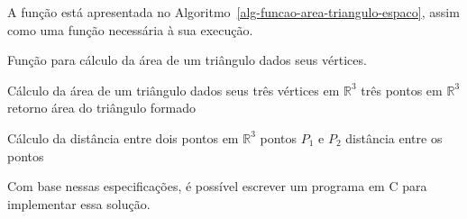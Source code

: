\documentclass[
  11pt,
  a4paper,
]{scrbook}
\begin{document}
A função  está apresentada no
Algoritmo~\ref{alg-funcao-area-triangulo-espaco}, assim como uma função
 necessária à sua execução.

\begin{algorithm}[H]
\caption{\label{alg-funcao-area-triangulo-espaco}Função para cálculo da
área de um triângulo dados seus vértices.}
\begingroup%

\begin{algorithmic}
    \Description Cálculo da área de um triângulo dados seus três vértices em $\mathbb{R}^3$
    \Require três pontos em $\mathbb{R}^3$
    \Ensure retorno área do triângulo formado
    \Statex
    \EndFunction

    \Statex{}
    \Statex{}
    \Description Cálculo da distância entre dois pontos em $\mathbb{R}^3$
    \Require pontos $P_1$ e $P_2$
    \Ensure distância entre os pontos
    \Statex
    \EndFunction
\end{algorithmic}

\endgroup
\end{algorithm}

Com base nessas especificações, é possível escrever um programa em C
para implementar essa solução.
\end{document}
